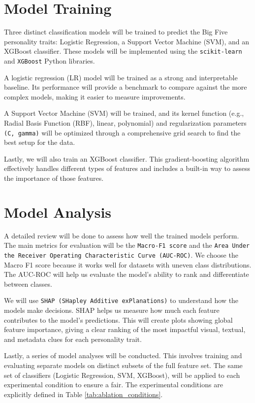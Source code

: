 \section{Model Training}
\label{subsec:models}

Three distinct classification models will be trained to predict the Big Five personality traits: Logistic Regression, a Support Vector Machine (SVM), and an XGBoost classifier. These models will be implemented using the \texttt{scikit-learn} \citep{pedregosa2011} and \texttt{XGBoost} \citep{chen2016} Python libraries.

A logistic regression (LR) model will be trained as a strong and interpretable baseline. Its performance will provide a benchmark to compare against the more complex models, making it easier to measure improvements.

A Support Vector Machine (SVM) will be trained, and its kernel function (e.g., Radial Basis Function (RBF), linear, polynomial) and regularization parameters \texttt{(C, gamma)} will be optimized through a comprehensive grid search to find the best setup for the data.

Lastly, we will also train an XGBoost classifier. This gradient-boosting algorithm effectively handles different types of features and includes a built-in way to assess the importance of those features.

\section{Model Analysis}
\label{subsec:analysis}
A detailed review will be done to assess how well the trained models perform. The main metrics for evaluation will be the \texttt{Macro-F1 score} and the \texttt{Area Under the Receiver Operating Characteristic Curve (AUC-ROC)}. We choose the Macro F1 score because it works well for datasets with uneven class distributions. The AUC-ROC will help us evaluate the model's ability to rank and differentiate between classes.

We will use \texttt{SHAP (SHapley Additive exPlanations)} to understand how the models make decisions. SHAP helps us measure how much each feature contributes to the model's predictions. This will create plots showing global feature importance, giving a clear ranking of the most impactful visual, textual, and metadata clues for each personality trait.

Lastly, a series of model analyses will be conducted. This involves training and evaluating separate models on distinct subsets of the full feature set. The same set of classifiers (Logistic Regression, SVM, XGBoost), will be applied to each experimental condition to ensure a fair. The experimental conditions are explicitly defined in Table \ref{tab:ablation_conditions}.

